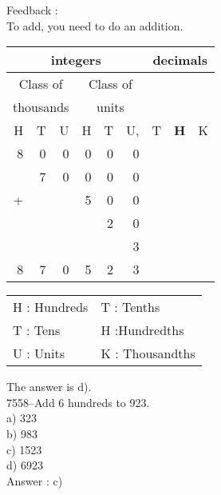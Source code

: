 \documentclass[letterpaper, 12pt]{article}
\begin{document}
Feedback :\\
To add, you need to do an addition.
\begin{center}
\begin{tabular}{|rrr|rrr|rrr|}
\hline
\multicolumn{6}{|c|}{integers} &\multicolumn{3}{|c|}{decimals} \\
\hline
\multicolumn{3}{|c|}{Class of} &\multicolumn{3}{|c|}{Class of} &  \multicolumn{3}{c|}{} \\
\multicolumn{3}{|c|}{thousands} &\multicolumn{3}{|c|}{units} &  \multicolumn{3}{c|}{} \\
\hline
H & T & U &H & T & U, & T\up{th} & \textbf{H\up{th}} & K\up{th} \\
\hline
\hline
8 & 0 & 0 & 0 & 0 & 0 &  & &\\
 & 7 & 0 & 0 & 0 & 0 &  & &\\
+ &  &  & 5 & 0 & 0 &  & &\\
 &  &  &  & 2 & 0 &  & &\\
 &  &  &  &  & 3 &  & &\\
\hline
\hline
 8 & 7 & 0 & 5 & 2 & 3 &  & &
\\
\hline
\end{tabular}
\end{center}

\scriptsize
\begin{center}
\begin{tabular}{ll}
H : Hundreds & T\up{th} : Tenths\\
T : Tens & H\up{th} :Hundredths\\
U : Units & K\up{e} : Thousandths\\
\end{tabular}
\end{center}

\normalsize
The answer is d).\\




7558--Add 6 hundreds to 923.\\

a) 323\\
b) 983\\
c) 1523\\
d) 6923\\

Answer : c)\\
\end{document}
